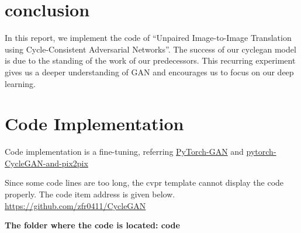 \documentclass[10pt,twocolumn,letterpaper]{article}
\begin{document}
\section{conclusion }

In this report, we implement the code of 
“Unpaired Image-to-Image Translation 
using Cycle-Consistent Adversarial Networks”. 
The success of our cyclegan model is 
due to the standing of the work of our predecessors.
This recurring experiment gives us a deeper 
understanding of GAN and encourages us to focus on our deep learning.



\section{Code Implementation }

Code implementation is a fine-tuning, referring \href{https://github.com/eriklindernoren/PyTorch-GAN}{PyTorch-GAN}
and 
\href{https://github.com/junyanz/pytorch-CycleGAN-and-pix2pix}{pytorch-CycleGAN-and-pix2pix}









Since some code lines are too long, the cvpr template cannot display the code properly. The code item address is given below.	\url{https://github.com/zfr0411/CycleGAN}

\bf{The folder where the code is located: code}



{\small


}
\end{document}
